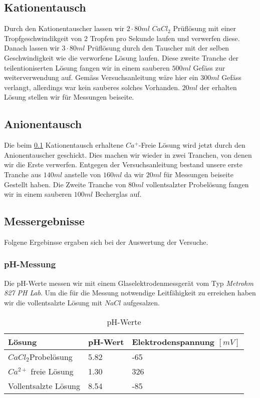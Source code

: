 \documentclass[10pt,oneside,a4paper,fleqn]{article}
\begin{document}
\subsection{Kationentausch}
\label{sec:kat}
Durch den Kationentauscher lassen wir $2 \cdot 80 ml$ $CaCl_2$ Prüflösung mit
einer Tropfgeschwindikgeit von 2 Tropfen pro Sekunde laufen und verwerfen diese.
Danach lassen wir $3 \cdot 80 ml$ Prüflösung durch den Tauscher mit der selben
Geschwindigkeit wie die verworfene Lösung laufen. Diese zweite Tranche
der teilentioniserten Lösung fangen wir in einem sauberen $500 ml$ Gefäss zur
weiterverwendung auf. Gemäss Versuchsanleitung wäre hier ein $300 ml$ Gefäss
verlangt, allerdings war kein sauberes solches Vorhanden. $20 ml$ der erhalten
Lösung stellen wir für Messungen beiseite.

\subsection{Anionentausch}
Die beim \ref{sec:kat} Kationentausch erhaltene $Ca^+$-Freie Lösung wird jetzt
durch den Anionentauscher geschickt. Dies machen wir wieder in zwei
Tranchen, von denen wir die Erste verwerfen. Entgegen der
Versuchsanleitung bestand unsere erste Tranche aus $140 ml$ anstelle von $160ml$ da wir $20 ml $ für Messungen
beiseite Gestellt haben. Die Zweite Tranche von $80 ml$ vollentsalzter
Probelösung fangen wir in einem sauberen $100ml$
Becherglas auf.

\subsection{Messergebnisse}
Folgene Ergebinsse ergaben sich bei der Auswertung der Versuche.

\subsubsection{pH-Messung}
Die pH-Werte messen wir mit einem Glaselektrodenmessgerät vom Typ
\textit{Metrohm 827 PH Lab}. Um die für die Messung notwendige Leitfähigkeit zu
erreichen haben wir die vollentsalzte Lösung mit $NaCl$ aufgesalzen.

\begin{table}[h]
\caption{pH-Werte}
\label{tab:pHMess}
\centering
	\begin{tabular}{|l|l|l|}
		\hline
		Lösung & pH-Wert & Elektrodenspannung $\left[mV\right]$ \\
		\hline
		$CaCl_{2}$Probelösung & 5.82 & -65 \\
		\hline
		$Ca^{2+}$ freie Lösung & 1.30 & 326 \\
		\hline
		Vollentsalzte Lösung & 8.54 & -85\\
		\hline
	\end{tabular}
\end{table}
\end{document}
